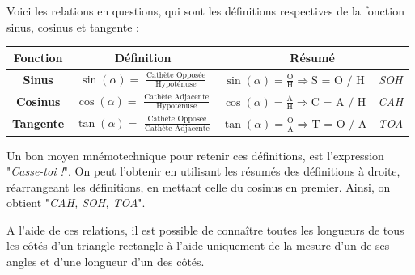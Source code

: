 \documentclass[a4paper]{article}
\begin{document}
\newpage

			Voici les relations en questions, qui sont les définitions respectives de la fonction sinus, cosinus et tangente :
			
			\begin{center}
				
				\renewcommand{\arraystretch}{2}
				\begin{tabular}{|c|ccc|}
					\hline
					\textbf{Fonction} & \textbf{Définition}                                                                 & \multicolumn{2}{c|}{\textbf{Résumé}} \\
					\hline
					\textbf{Sinus}    & $\sin(\alpha) =$ {\Large $\frac{\text{Cathète Opposée}}{\text{Hypoténuse}}$       } & $\sin(\alpha) = \frac{\text{O}}{\text{H}} \Longrightarrow \text{S = O / H} $ & \textit{SOH} \\
					\textbf{Cosinus}  & $\cos(\alpha) =$ {\Large $\frac{\text{Cathète Adjacente}}{\text{Hypoténuse}}$     } & $\cos(\alpha) = \frac{\text{A}}{\text{H}} \Longrightarrow \text{C = A / H} $ & \textit{CAH} \\
					\textbf{Tangente} & $\tan(\alpha) =$ {\Large $\frac{\text{Cathète Opposée}}{\text{Cathète Adjacente}}$} & $\tan(\alpha) = \frac{\text{O}}{\text{A}} \Longrightarrow \text{T = O / A} $ & \textit{TOA} \\
					\hline
				\end{tabular}
			\end{center}

			Un bon moyen mnémotechnique pour retenir ces définitions, 
			est l'expression "\textit{Casse-toi !}". 
			On peut l'obtenir en utilisant les résumés des définitions à droite, 
			réarrangeant les définitions, en mettant celle du cosinus en premier.
			Ainsi, on obtient "\textit{CAH, SOH, TOA}".
			
			\medbreak

			A l'aide de ces relations, 
			il est possible de connaître toutes les longueurs de 
			tous les côtés d'un triangle rectangle à l'aide uniquement 
			de la mesure d'un de ses angles et d'une longueur d'un des côtés.

			
			{ \noindent
			}
\end{document}
